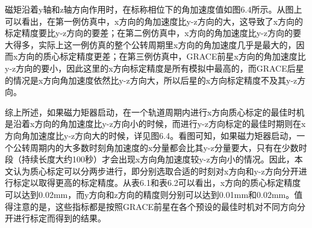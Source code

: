 \documentclass[UTF8,12pt,a4paper,floats,amsmath,amssymb]{ctexart}
\begin{document}
磁矩沿着y轴和z轴方向作用时，在标称相位下的角加速度值如图6.4所示。从图上可以看出，在第一例仿真中，x方向的角加速度比y-z方向的大，这导致了x方向的标定精度要比y-z方向的要差；在第二例仿真中，x方向的角加速度比y-z方向的要大得多，实际上这一例仿真的整个公转周期里x方向的角加速度几乎是最大的，因而x方向的质心标定精度更差；在第三例仿真中，GRACE前星x方向的角加速度比y-z方向的要小，因此这里的x方向标定精度是所有模拟中最高的，而GRACE后星的情况是x方向角加速度依然比y-z方向大，所以后星的x方向标定精度不及其y-z方向。

综上所述，如果磁力矩器启动，在一个轨道周期内进行x方向质心标定的最佳时机是沿着x方向的角加速度比y-z方向小的时候，而进行y-z方向标定的最佳时期则在x方向角加速度比y-z方向大的时候，详见图6.4。看图可知，如果磁力矩器启动，一个公转周期内的大多数时刻角加速度的x分量都会比其y-z分量要大，只有在少数时段（持续长度大约100秒）才会出现x方向角加速度较y-z方向小的情况。因此，本文认为质心标定可以分两步进行，即分别选取合适的时刻对x方向和y-z方向分开进行标定以取得更高的标定精度。从表6.1和表6.2可以看出，x方向的质心标定精度可以达到0.02mm，而y方向和z方向的精度则分别可以达到0.01mm和0.02mm。值得注意的是，这些指标都是按照GRACE前星在各个预设的最佳时机对不同方向分开进行标定而得到的结果。
\end{document}
